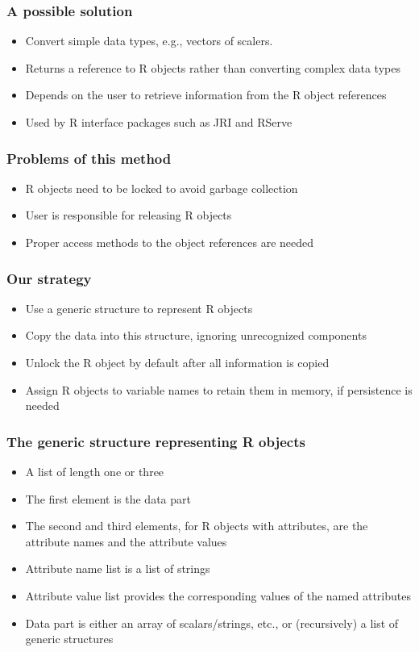\documentclass{beamer}
\begin{document}
\begin{frame}
\frametitle{A possible solution}
\begin{itemize}
	\item Convert simple data types, e.g., vectors of scalers.
	\item Returns a reference to R objects rather than converting complex data types
	\item Depends on the user to retrieve information from the R object references
	\item Used by R interface packages such as JRI and RServe
\end{itemize}
\end{frame}

\begin{frame}
\frametitle{Problems of this method}
\begin{itemize}
	\item R objects need to be locked to avoid garbage collection
	\item User is responsible for releasing R objects
	\item Proper access methods to the object references are needed
\end{itemize}
\end{frame}

\begin{frame}
\frametitle{Our strategy}
\begin{itemize}
	\item Use a generic structure to represent R objects
	\item Copy the data into this structure, ignoring unrecognized components
	\item Unlock the R object by default after all information is copied
	\item Assign R objects to variable names to retain them in memory, if persistence is needed
\end{itemize}
\end{frame}

\begin{frame}
\frametitle{The generic structure representing R objects}
\begin{itemize}
	\item A list of length one or three
	\item The first element is the data part
	\item The second and third elements, for R objects with attributes, are the attribute names and the attribute values
	\item Attribute name list is a list of strings
	\item Attribute value list provides the corresponding values of the named attributes
	\item Data part is either an array of scalars/strings, etc., or (recursively) a list of generic structures
\end{itemize}
\end{frame}
\end{document}
